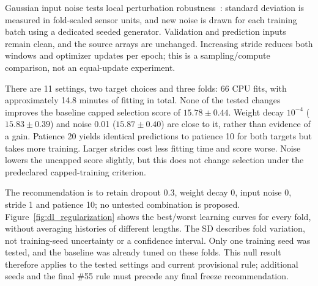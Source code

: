 Gaussian input noise tests local perturbation robustness~\cite{Bishop1995noise}:
standard deviation is measured in fold-scaled sensor units, and new noise is
drawn for each training batch using a dedicated seeded generator. Validation
and prediction inputs remain clean, and the source arrays are unchanged.
Increasing stride reduces both windows and optimizer updates per epoch;
this is a sampling/compute comparison, not an equal-update experiment.

\begin{table}[t]
\centering
\caption{Selection RMSE (cycles), mean $\pm$ sample SD across three folds,
training seed 42. Each non-baseline row changes one factor. Capped training
uses $C=125$; both columns use true-RUL threshold $K=130$. Provisional until \#55.}
\label{tab:dl_regularization}
\footnotesize

\end{table}

There are 11 settings, two target choices and three folds: 66 CPU fits,
with approximately 14.8 minutes of fitting in total. None of the tested
changes improves the baseline capped selection score of $15.78\pm0.44$.
Weight decay $10^{-4}$ ($15.83\pm0.39$) and noise 0.01 ($15.87\pm0.40$)
are close to it, rather than evidence of a gain. Patience 20 yields identical
predictions to patience 10 for both targets but takes more training.
Larger strides cost less fitting time and score worse. Noise lowers the
uncapped score slightly, but this does not change selection under the
predeclared capped-training criterion.

The recommendation is to retain dropout 0.3, weight decay 0, input noise 0,
stride 1 and patience 10; no untested combination is proposed.
Figure~\ref{fig:dl_regularization} shows the best/worst learning curves
for every fold, without averaging histories of different lengths.
The SD describes fold variation, not training-seed uncertainty or a
confidence interval. Only one training seed was tested, and the baseline
was already tuned on these folds. This null result therefore applies to
the tested settings and current provisional rule; additional seeds and
the final \#55 rule must precede any final freeze recommendation.
